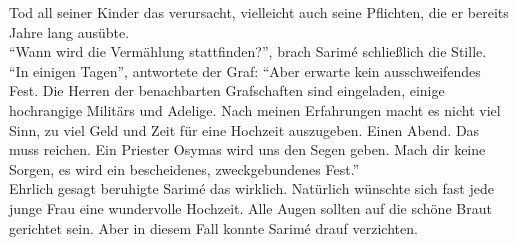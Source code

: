 Tod all seiner Kinder das verursacht, vielleicht auch seine Pflichten, die er bereits Jahre lang 
ausübte.\\
``Wann wird die Vermählung stattfinden?'', brach Sarimé schließlich die Stille. \\
``In einigen Tagen'', antwortete der Graf: ``Aber erwarte kein ausschweifendes Fest. Die Herren der 
benachbarten Grafschaften sind eingeladen, einige hochrangige Militärs und Adelige. Nach meinen 
Erfahrungen macht es nicht viel Sinn,  zu viel Geld und Zeit für eine Hochzeit auszugeben. Einen 
Abend. Das muss reichen. Ein Priester Osymas wird uns den Segen geben. Mach dir keine Sorgen, es 
wird ein bescheidenes, zweckgebundenes Fest.''\\
Ehrlich gesagt beruhigte Sarimé das wirklich. Natürlich wünschte sich fast jede junge Frau eine 
wundervolle Hochzeit. Alle Augen sollten auf die schöne Braut gerichtet sein. Aber in diesem Fall 
konnte Sarimé drauf verzichten. \\